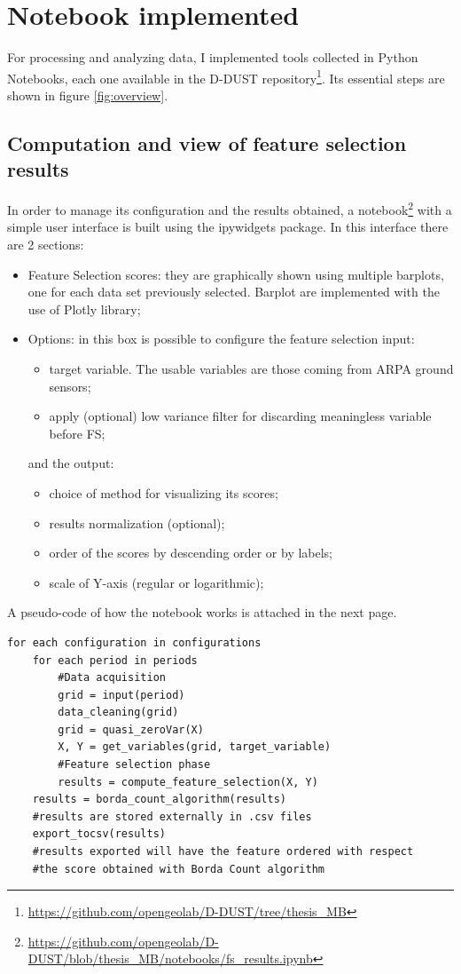 \section{Notebook implemented}
For processing and analyzing data, I implemented tools collected in Python Notebooks, each one available in the D-DUST repository\footnote{\url{https://github.com/opengeolab/D-DUST/tree/thesis_MB}}.\newline
Its essential steps are shown in figure \ref{fig:overview}.

\subsection{Computation and view of feature selection results}
In order to manage its configuration and the results obtained, a notebook\footnote{\url{https://github.com/opengeolab/D-DUST/blob/thesis_MB/notebooks/fs_results.ipynb}} with a simple user interface is built using the ipywidgets package.
In this interface there are 2 sections:
\begin{itemize}
\item Feature Selection scores: they are graphically shown using multiple barplots, one for each data set previously selected. Barplot are implemented with the use of Plotly library; 
\item Options: in this box is possible to configure the feature selection input:
\begin{itemize}
\item target variable. The usable variables are those coming from ARPA ground sensors;
\item apply (optional) low variance filter for discarding meaningless variable before FS;
\end{itemize}
and the output:
\begin{itemize}
\item choice of method for visualizing its scores;
\item results normalization (optional);
\item order of the scores by descending order or by labels;
\item scale of Y-axis (regular or logarithmic);
\end{itemize}
\end{itemize}
A pseudo-code of how the notebook works is attached in the next page.\pagebreak
\begin{verbatim}
for each configuration in configurations
    for each period in periods
        #Data acquisition
        grid = input(period)
        data_cleaning(grid)
        grid = quasi_zeroVar(X)
        X, Y = get_variables(grid, target_variable)
        #Feature selection phase
        results = compute_feature_selection(X, Y)
    results = borda_count_algorithm(results)
    #results are stored externally in .csv files
    export_tocsv(results) 
    #results exported will have the feature ordered with respect
    #the score obtained with Borda Count algorithm
\end{verbatim}
